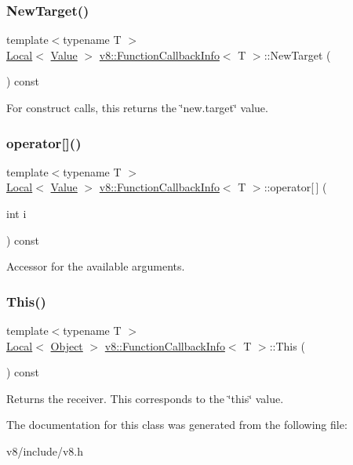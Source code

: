 \subsubsection{\texorpdfstring{New\+Target()}{NewTarget()}}
{\footnotesize\ttfamily template$<$typename T $>$ \\
\mbox{\hyperlink{classv8_1_1Local}{Local}}$<$ \mbox{\hyperlink{classv8_1_1Value}{Value}} $>$ \mbox{\hyperlink{classv8_1_1FunctionCallbackInfo}{v8\+::\+Function\+Callback\+Info}}$<$ T $>$\+::New\+Target (\begin{DoxyParamCaption}{ }\end{DoxyParamCaption}) const}

For construct calls, this returns the \char`\"{}new.\+target\char`\"{} value. \mbox{\label{classv8_1_1FunctionCallbackInfo_a77dce5cad7b198c4181a522e9e0ab10f}} 
\subsubsection{\texorpdfstring{operator[]()}{operator[]()}}
{\footnotesize\ttfamily template$<$typename T $>$ \\
\mbox{\hyperlink{classv8_1_1Local}{Local}}$<$ \mbox{\hyperlink{classv8_1_1Value}{Value}} $>$ \mbox{\hyperlink{classv8_1_1FunctionCallbackInfo}{v8\+::\+Function\+Callback\+Info}}$<$ T $>$\+::operator\mbox{[}$\,$\mbox{]} (\begin{DoxyParamCaption}\item[{int}]{i }\end{DoxyParamCaption}) const}

Accessor for the available arguments. \mbox{\label{classv8_1_1FunctionCallbackInfo_a4ddfd6d21732dff1c4c55d5441a8a5ca}} 
\subsubsection{\texorpdfstring{This()}{This()}}
{\footnotesize\ttfamily template$<$typename T $>$ \\
\mbox{\hyperlink{classv8_1_1Local}{Local}}$<$ \mbox{\hyperlink{classv8_1_1Object}{Object}} $>$ \mbox{\hyperlink{classv8_1_1FunctionCallbackInfo}{v8\+::\+Function\+Callback\+Info}}$<$ T $>$\+::This (\begin{DoxyParamCaption}{ }\end{DoxyParamCaption}) const}

Returns the receiver. This corresponds to the \char`\"{}this\char`\"{} value. 

The documentation for this class was generated from the following file\+:\begin{DoxyCompactItemize}
\item 
v8/include/v8.\+h\end{DoxyCompactItemize}
